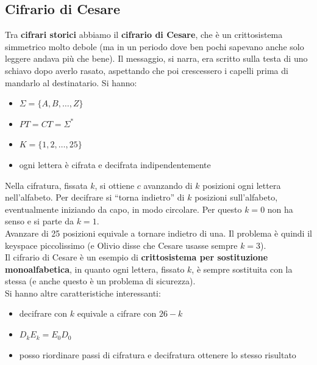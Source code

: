 \documentclass[a4paper,12pt, oneside]{book}
\begin{document}
\subsection{Cifrario di Cesare}
Tra \textbf{cifrari storici} abbiamo il \textbf{cifrario di Cesare}, che è un
crittosistema simmetrico molto debole (ma in un periodo dove ben pochi sapevano
anche solo leggere andava più che bene). Il messaggio, si narra, era scritto
sulla testa di uno schiavo dopo averlo rasato, aspettando che poi crescessero i
capelli prima di mandarlo al destinatario. Si hanno:
\begin{itemize}
  \item $\Sigma=\{A,B,\ldots, Z\}$
  \item $PT=CT=\Sigma^*$
  \item $K=\{1,2,\ldots,25\}$
  \item ogni lettera è cifrata e decifrata indipendentemente
\end{itemize}
Nella cifratura, fissata $k$, si ottiene $c$ avanzando di $k$ posizioni ogni
lettera nell'alfabeto. Per decifrare si ``torna indietro'' di $k$ posizioni
sull'alfabeto, eventualmente iniziando da capo, in modo circolare. Per questo
$k=0$ non ha senso e si parte da $k=1$.\\ 
Avanzare di 25 posizioni equivale a tornare indietro di una. Il problema è
quindi il keyspace piccolissimo (e Olivio disse che Cesare usasse sempre
$k=3$).\\
Il cifrario di Cesare è un esempio di \textbf{crittosistema per sostituzione
  monoalfabetica}, in quanto ogni lettera, fissato $k$, è sempre sostituita con
la stessa (e anche questo è un problema di sicurezza).\\
Si hanno altre caratteristiche interessanti:
\begin{itemize}
  \item decifrare con $k$ equivale a cifrare con $26-k$
  \item $D_kE_k=E_0D_0$
  \item posso riordinare passi di cifratura e decifratura ottenere lo stesso
  risultato 
\end{itemize}
\end{document}
